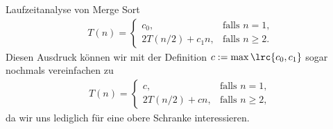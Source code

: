\begin{frame}[fragile]{Laufzeitanalyse von Merge Sort}
\begin{align}\label{eq:rek2}
	T(n) =
	\begin{cases}
		c_0,            & \text{falls $n = 1$,}   \\
		2T(n/2) + c_1n, & \text{falls $n\geq 2$}.
	\end{cases}
\end{align}
Diesen Ausdruck können wir mit der Definition $c := \max\lrc{c_0,c_1}$ sogar nochmals vereinfachen zu
\begin{align}\label{eq:rek3}
	T(n) =
	\begin{cases}
		c,            & \text{falls $n = 1$,}   \\
		2T(n/2) + cn, & \text{falls $n\geq 2$},
    \end{cases}
\end{align}
da wir uns lediglich für eine obere Schranke interessieren.
\end{frame}


